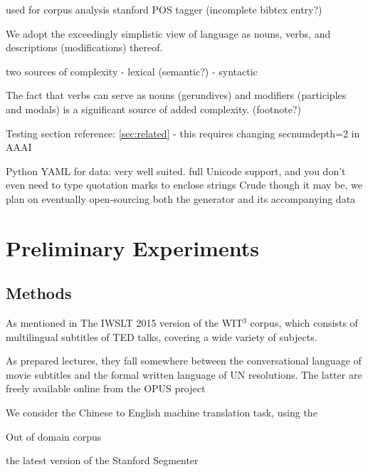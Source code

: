 used for corpus analysis stanford POS tagger (incomplete bibtex entry?) 

We adopt the exceedingly simplistic view of language as nouns, verbs, and descriptions (modifications) thereof.

two sources of complexity
- lexical (semantic?)
- syntactic 

The fact that verbs can serve as nouns (gerundives) and modifiers (participles and modals) is a significant source of added complexity. (footnote?)

Testing section reference: \ref{sec:related} - this requires changing secnumdepth=2 in AAAI

Python
YAML for data: very well suited. full Unicode support, and you don't even need to type quotation marks to enclose strings
Crude though it may be, we plan on eventually open-sourcing both the generator and its accompanying data





\section{Preliminary Experiments}
\label{experiments}

\subsection{Methods}
As mentioned in 
The IWSLT 2015 version of the WIT$^3$ corpus, which consists of multilingual subtitles of TED talks, covering a wide variety of subjects. 

As prepared lectures, they fall somewhere between the conversational language of movie subtitles and the formal written language of UN resolutions.
The latter are freely available online from the OPUS project  

We consider the Chinese to English machine translation task, using the 

Out of domain corpus

the latest version of the Stanford Segmenter 

